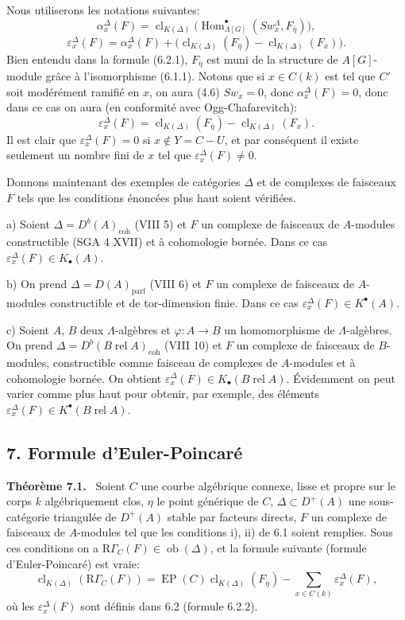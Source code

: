 \documentclass[11pt]{article}
\newenvironment{statement}[1]{\par\medskip\noindent\textbf{#1.}\ }{\par\medskip}
\DeclareMathOperator{\Hom}{Hom}
\newcommand{\R}{\mathrm{R}}\newcommand{\RHomCore}{\mathrm{RHom}}
\providecommand{\EP}{\operatorname{EP}}
\providecommand{\parf}{\mathrm{parf}}
\providecommand{\coh}{\mathrm{coh}}
\providecommand{\Ob}{\operatorname{ob}}
\providecommand{\Hom}{\operatorname{Hom}}
\providecommand{\Ob}{\operatorname{ob}}
\providecommand{\R}{\mathrm R}
\providecommand{\EP}{\operatorname{EP}}
\providecommand{\Ob}{\operatorname{Ob}}
\providecommand{\parf}{\mathrm{parf}}
\providecommand{\coh}{\mathrm{coh}}
\providecommand{\clK}[1]{\operatorname{cl}_{K(#1)}}
\providecommand{\RG}{\R\Gamma}
\providecommand{\Hom}{\operatorname{Hom}}
\providecommand{\Ob}{\operatorname{ob}}
\providecommand{\Ob}{\operatorname{Ob}}
\begin{document}
Nous utiliserons les notations suivantes:
\[
\alpha_x^\Delta(F)
=
\clK{\Delta}\bigl(\Hom^\bullet_{\Lambda[G]}(Sw_x^\Lambda,F_{\bar\eta})\bigr),
\tag{6.2.1}
\]
\[
\varepsilon_x^\Delta(F)
=
\alpha_x^\Delta(F)+
\bigl(\clK{\Delta}(F_{\bar\eta})-\clK{\Delta}(F_x)\bigr).
\tag{6.2.2}
\]
Bien entendu dans la formule (6.2.1), $F_{\bar\eta}$ est muni de la structure de $A[G]$-module grâce à l'isomorphisme (6.1.1). Notons que si $x\in C(k)$ est tel que $C'$ soit modérément ramifié en $x$, on aura (4.6) $Sw_x=0$, donc $\alpha_x^\Delta(F)=0$, donc dans ce cas on aura (en conformité avec Ogg-Chafarevitch):
\[
\varepsilon_x^\Delta(F)=\clK{\Delta}(F_{\bar\eta})-\clK{\Delta}(F_x).
\tag{6.2.3}
\]
Il est clair que $\varepsilon_x^\Delta(F)=0$ si $x\notin Y=C-U$, et par conséquent il existe seulement un nombre fini de $x$ tel que $\varepsilon_x^\Delta(F)\ne0$.

Donnons maintenant des exemples de catégories $\Delta$ et de complexes de faisceaux $F$ tels que les conditions énoncées plus haut soient vérifiées.

a) Soient $\Delta=D^b(A)_{\coh}$ (VIII 5) et $F$ un complexe de faisceaux de $A$-modules constructible (SGA 4 XVII) et à cohomologie bornée. Dans ce cas $\varepsilon_x^\Delta(F)\in K_\bullet(A)$.

b) On prend $\Delta=D(A)_{\parf}$ (VIII 6) et $F$ un complexe de faisceaux de $A$-modules constructible et de tor-dimension finie. Dans ce cas $\varepsilon_x^\Delta(F)\in K^{\bullet}(A)$.

c) Soient $A$, $B$ deux $\Lambda$-algèbres et $\varphi:A\to B$ un homomorphisme de $\Lambda$-algèbres. On prend $\Delta=D^b(B\operatorname{ rel }A)_{\coh}$ (VIII 10) et $F$ un complexe de faisceaux de $B$-modules, constructible comme faisceau de complexes de $A$-modules et à cohomologie bornée. On obtient $\varepsilon_x^\Delta(F)\in K_\bullet(B\operatorname{ rel }A)$. Évidemment on peut varier comme plus haut pour obtenir, par exemple, des éléments $\varepsilon_x^\Delta(F)\in K^{\bullet}(B\operatorname{ rel }A)$.

\subsection*{7. Formule d'Euler-Poincaré}

\begin{statement}{Théorème 7.1}
Soient $C$ une courbe algébrique connexe, lisse et propre sur le corps $k$ algébriquement clos, $\eta$ le point générique de $C$, $\Delta\subset D^+(A)$ une sous-catégorie triangulée de $D^+(A)$ stable par facteurs directs, $F$ un complexe de faisceaux de $A$-modules tel que les conditions i), ii) de 6.1 soient remplies. Sous ces conditions on a $\RG_C(F)\in\Ob(\Delta)$, et la formule suivante (formule d'Euler-Poincaré) est vraie:
\[
\clK{\Delta}(\RG_C(F))
=
\EP(C)\clK{\Delta}(F_{\bar\eta})
-\sum_{x\in C(k)}\varepsilon_x^\Delta(F),
\tag{7.2}
\]
où les $\varepsilon_x^\Delta(F)$ sont définis dans 6.2 (formule 6.2.2).
\end{statement}
\end{document}
